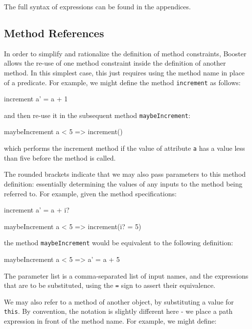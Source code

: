 The full syntax of expressions can be found in the appendices.


\subsection{Method References}

In order to simplify and rationalize the definition of method
constraints, Booster allows the re-use of one method constraint inside
the definition of another method.  In this simplest case, this just
requires using the method name in place of a predicate.  For example,
we might define the method \verb|increment| as follows:

\begin{code}
  increment { a' = a + 1 }
\end{code}

and then re-use it in the subsequent method \verb|maybeIncrement|:

\begin{code}
  maybeIncrement { a < 5 => increment() }
\end{code}

which performs the increment method if the value of attribute \verb|a|
has a value less than five before the method is called.

The rounded brackets indicate that we may also pass parameters to this
method definition: essentially determining the values of any inputs to
the method being referred to.  For example, given the method
specifications:

\begin{code}
  increment { a' = a + i? }

  maybeIncrement { a < 5 => increment(i? = 5) }
\end{code}

the method \verb|maybeIncrement| would be equivalent to the following
definition:

\begin{code}
  maybeIncrement { a < 5 => a' = a + 5 }
\end{code}

The parameter list is a comma-separated list of input names, and the
expressions that are to be substituted, using the \verb|=| sign to
assert their equivalence.

We may also refer to a method of another object, by substituting a
value for \verb|this|.  By convention, the notation is slightly
different here - we place a path expression in front of the method
name.  For example, we might define:

